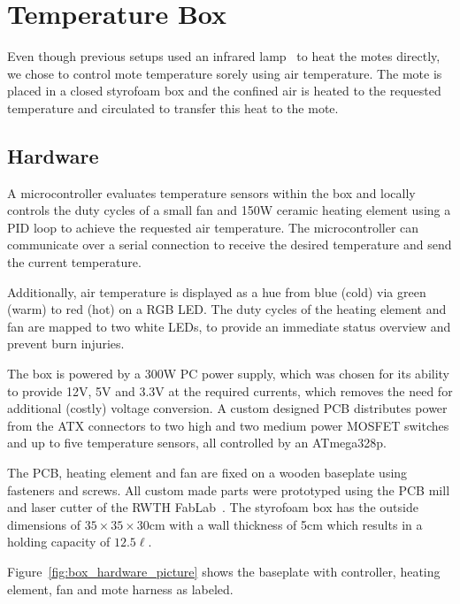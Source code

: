 \section{Temperature Box}
\label{sec:temperature_box}

Even though previous setups used an infrared lamp~\cite{Boano2013, Hermans2013} to heat the motes directly, we chose to control mote temperature sorely using air temperature.
The mote is placed in a closed styrofoam box and the confined air is heated to the requested temperature and circulated to transfer this heat to the mote.

\subsection{Hardware}
A microcontroller evaluates temperature sensors within the box and locally controls the duty cycles of a small fan and 150W ceramic heating element using a \acs{PID} loop to achieve the requested air temperature.
The microcontroller can communicate over a serial connection to receive the desired temperature and send the current temperature.

Additionally, air temperature is displayed as a hue from blue (cold) via green (warm) to red (hot) on a RGB LED.
The duty cycles of the heating element and fan are mapped to two white LEDs, to provide an immediate status overview and prevent burn injuries.

The box is powered by a 300W PC power supply, which was chosen for its ability to provide 12V, 5V and 3.3V at the required currents, which removes the need for additional (costly) voltage conversion.
A custom designed PCB distributes power from the \acs{ATX} connectors to two high and two medium power \acs{MOSFET} switches and up to five temperature sensors, all controlled by an ATmega328p.

The PCB, heating element and fan are fixed on a wooden baseplate using fasteners and screws.
All custom made parts were prototyped using the PCB mill and laser cutter of the RWTH FabLab~\cite{fablab}.
The styrofoam box has the outside dimensions of $35 \times 35 \times 30$cm with a wall thickness of 5cm which results in a holding capacity of $12.5\ell$.

Figure~\ref{fig:box_hardware_picture} shows the baseplate with controller, heating element, fan and mote harness as labeled.

